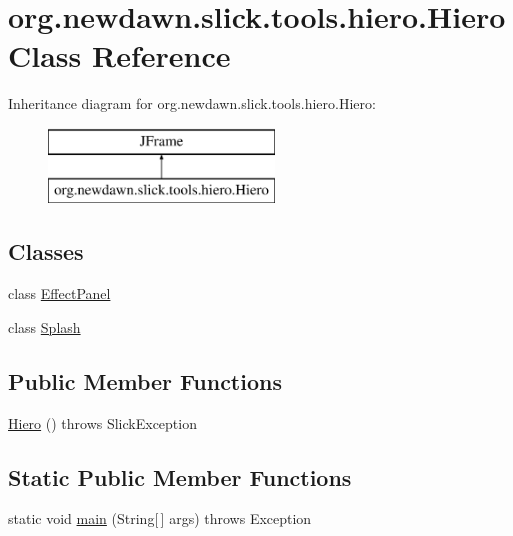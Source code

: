 \hypertarget{classorg_1_1newdawn_1_1slick_1_1tools_1_1hiero_1_1_hiero}{}\section{org.\+newdawn.\+slick.\+tools.\+hiero.\+Hiero Class Reference}
\label{classorg_1_1newdawn_1_1slick_1_1tools_1_1hiero_1_1_hiero}
Inheritance diagram for org.\+newdawn.\+slick.\+tools.\+hiero.\+Hiero\+:\begin{figure}[H]
\begin{center}
\leavevmode
\includegraphics[height=2.000000cm]{classorg_1_1newdawn_1_1slick_1_1tools_1_1hiero_1_1_hiero}
\end{center}
\end{figure}
\subsection*{Classes}
\begin{DoxyCompactItemize}
\item 
class \mbox{\hyperlink{classorg_1_1newdawn_1_1slick_1_1tools_1_1hiero_1_1_hiero_1_1_effect_panel}{Effect\+Panel}}
\item 
class \mbox{\hyperlink{classorg_1_1newdawn_1_1slick_1_1tools_1_1hiero_1_1_hiero_1_1_splash}{Splash}}
\end{DoxyCompactItemize}
\subsection*{Public Member Functions}
\begin{DoxyCompactItemize}
\item 
\mbox{\hyperlink{classorg_1_1newdawn_1_1slick_1_1tools_1_1hiero_1_1_hiero_ad35908dac0e9755fd418874dff6d2dcd}{Hiero}} ()  throws Slick\+Exception 
\end{DoxyCompactItemize}
\subsection*{Static Public Member Functions}
\begin{DoxyCompactItemize}
\item 
static void \mbox{\hyperlink{classorg_1_1newdawn_1_1slick_1_1tools_1_1hiero_1_1_hiero_af2f941178dbc3bb76d6f23c587f421af}{main}} (String\mbox{[}$\,$\mbox{]} args)  throws Exception 
\end{DoxyCompactItemize}
